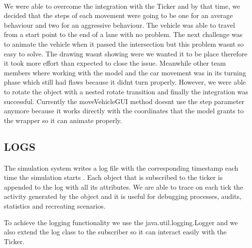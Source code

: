 \documentclass[a4paper]{article}
\begin{document}
\paragraph{}
We were able to overcome the integration with the Ticker and by that time, we decided that the steps of each movement were going to be one for an average behaviour and two for an aggressive behaviour. The vehicle was able to travel from a start point to the end of a lane with no problem. The next challenge was to animate the vehicle when it passed the intersection but this problem wasn\textsc{}t so easy to solve. The drawing wasn\textsc{}t showing were we wanted it to be place therefore it took more effort than expected to close the issue. Meanwhile other team members where working with the model and the car movement was in its turning phase which still had flaws because it didn\textsc{}t turn properly. However, we were able to rotate the object with a nested rotate transition and finally the integration was successful. Currently the moveVehicleGUI method doesn\textsc{}t use the step parameter anymore because it works directly with the coordinates that the model grants to the wrapper so it can animate properly.

\subsection{LOGS}
\paragraph{}
The simulation system writes a log file with the corresponding timestamp each time the simulation starts . Each object that is subscribed to the ticker is appended to the log with all its attributes. We are able to trace on each tick the activity generated by the object and it is useful for debugging processes, audits, statistics and recreating scenarios. 

To achieve the logging functionality we use the java.util.logging.Logger and we also extend the log class to the subscriber so it can interact easily with the Ticker.
\end{document}
